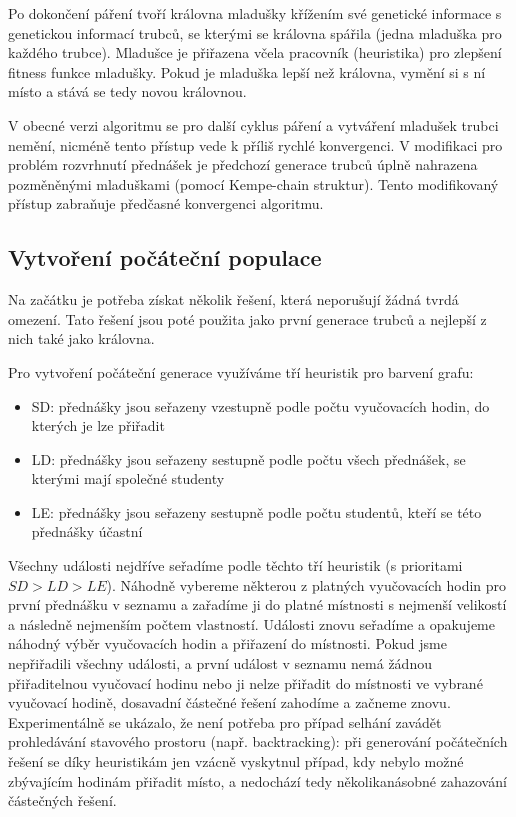 \documentclass[12pt, a4paper]{article}
\begin{document}
Po dokončení páření tvoří královna mladušky křížením své genetické informace s genetickou informací trubců, se kterými se královna spářila (jedna mladuška pro každého trubce).
Mladušce je přiřazena včela pracovník (heuristika) pro zlepšení fitness funkce mladušky.
Pokud je mladuška lepší než královna, vymění si s ní místo a stává se tedy novou královnou.

V obecné verzi algoritmu se pro další cyklus páření a vytváření mladušek trubci nemění, nicméně tento přístup vede k příliš rychlé konvergenci.
V modifikaci pro problém rozvrhnutí přednášek je předchozí generace trubců úplně nahrazena pozměněnými mladuškami (pomocí Kempe-chain struktur).
Tento modifikovaný přístup zabraňuje předčasné konvergenci algoritmu.

\subsection{Vytvoření počáteční populace}
Na začátku je potřeba získat několik řešení, která neporušují žádná tvrdá omezení.
Tato řešení jsou poté použita jako první generace trubců a nejlepší z nich také jako královna.

Pro vytvoření počáteční generace využíváme tří heuristik pro barvení grafu:
\begin{itemize}
  \item SD: přednášky jsou seřazeny vzestupně podle počtu vyučovacích hodin, do kterých je lze přiřadit
  \item LD: přednášky jsou seřazeny sestupně podle počtu všech přednášek, se kterými mají společné studenty
  \item LE: přednášky jsou seřazeny sestupně podle počtu studentů, kteří se této přednášky účastní
\end{itemize}
Všechny události nejdříve seřadíme podle těchto tří heuristik (s prioritami $SD > LD > LE$). Náhodně vybereme některou z platných vyučovacích hodin pro první přednášku v seznamu a zařadíme
ji do platné místnosti s nejmenší velikostí a následně nejmenším počtem vlastností.
Události znovu seřadíme a opakujeme náhodný výběr vyučovacích hodin a přiřazení do míst\-nos\-ti.
Pokud jsme nepřiřadili všechny události, a první událost v seznamu nemá žádnou přiřaditelnou vyučovací hodinu nebo ji nelze přiřadit do míst\-nos\-ti ve vybrané vyučovací hodině, dosavadní částečné řešení
zahodíme a začneme znovu.
Experimentálně se ukázalo, že není potřeba pro případ selhání zavádět prohledávání stavového prostoru (např. backtracking):
při generování po\-čá\-teč\-ních řešení se díky heuristikám jen vzácně vyskytnul případ, kdy nebylo možné zbývajícím hodinám přiřadit místo,
a nedochází tedy ně\-ko\-li\-ka\-ná\-sob\-né zahazování částečných řešení.
\end{document}
